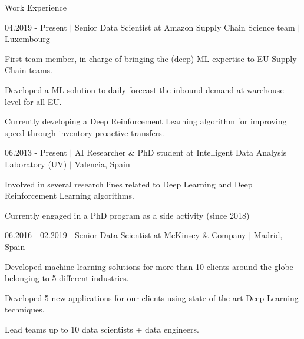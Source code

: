 \documentclass{resume} %
\begin{document}
\begin{rSection}{Work Experience} \itemsep -1pt
\begin{rSubsection}{04.2019 - Present $|$ Senior Data Scientist at Amazon Supply Chain Science team  $|$  \textnormal{Luxembourg}}{}{}

	\vspace{-3pt}

	\item First team member, in charge of bringing the (deep) ML expertise to EU Supply Chain teams.
	\item Developed a ML solution to daily forecast the inbound demand at warehouse level for all EU.
	\item Currently developing a Deep Reinforcement Learning algorithm for improving speed through inventory proactive transfers.
\end{rSubsection}


\vspace{-6pt}

\begin{rSubsection}{06.2013 - Present $|$ AI Researcher \& PhD student at Intelligent Data Analysis Laboratory (UV) $|$ \textnormal{Valencia, Spain}\hspace{-10pt}}{}{} 

	\vspace{-3pt}

	\item Involved in several research lines related to Deep Learning and Deep Reinforcement Learning algorithms.
	\item Currently engaged in a PhD program as a side activity (since 2018)

\end{rSubsection}

\vspace{-6pt}

\begin{rSubsection}{06.2016 - 02.2019 $|$ Senior Data Scientist at McKinsey \& Company  $|$ \textnormal{Madrid, Spain}}{}{}

    \vspace{-3pt}

    \item Developed machine learning solutions for more than 10 clients around the globe belonging to 5 different industries.
    \item Developed 5 new applications for our clients using state-of-the-art Deep Learning techniques.
    \item Lead teams up to 10 data scientists + data engineers.
\end{rSubsection}


\end{rSection}
\end{document}
